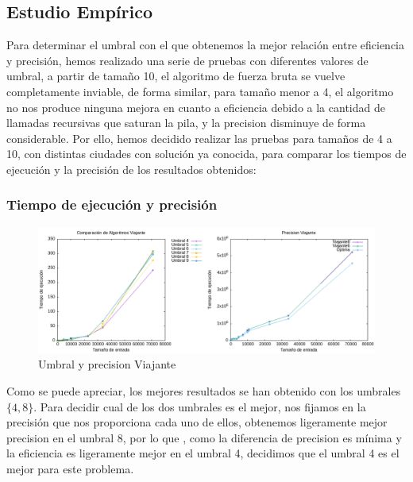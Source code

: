 \documentclass[11pt,openany]{book}
\begin{document}
\subsection{Estudio Empírico}
Para determinar el umbral con el que obtenemos la mejor relación entre eficiencia y precisión, hemos
realizado una serie de pruebas con diferentes valores de umbral, a partir de tamaño 10, el algoritmo de
fuerza bruta se vuelve completamente inviable, de forma similar, para tamaño menor a 4, el algoritmo
no nos produce ninguna mejora en cuanto a eficiencia debido a la cantidad de llamadas recursivas que
saturan la pila, y la precision disminuye de forma considerable. Por ello, hemos decidido realizar
las pruebas para tamaños de 4 a 10, con distintas ciudades con solución ya conocida, para comparar
los tiempos de ejecución y la precisión de los resultados obtenidos:
\subsubsection*{Tiempo de ejecución y precisión}
\begin{center}
      \begin{figure}[H]
            \centering
            \includegraphics[width=1\linewidth]{assets/Img/P3PrecisionUmbral.png}
            \caption{Umbral y precision Viajante}
            \label{fig:P3UmbralPrec}
      \end{figure}
\end{center}

Como se puede apreciar, los mejores resultados se han obtenido con los umbrales $\{4,8\}$.
Para decidir cual de los dos umbrales es el mejor, nos fijamos en la precisión
que nos proporciona cada uno de ellos, obtenemos ligeramente mejor precision en el umbral 8, por lo que
, como la diferencia de precision es mínima y la eficiencia es ligeramente mejor en el umbral 4, decidimos
que el umbral 4 es el mejor para este problema.
\end{document}
